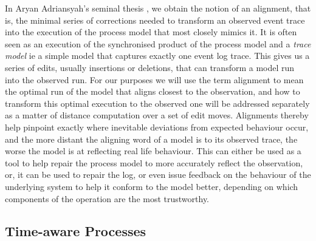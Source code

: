 \documentclass{article}
\theoremstyle{Definition}
\theoremstyle{definition}
\begin{document}
	In Aryan Adriansyah's seminal thesis \cite{Adriansyah2014AligningOA} , we obtain the notion of an alignment, that is, the minimal series of corrections needed to transform an observed event trace into the execution of the process model that most closely mimics it.  
	It is often seen as an execution of the synchronised product of the process model and a \emph{trace model} ie a simple model that captures exactly one event log trace. 
	This gives us a series of edits, usually insertions or deletions, that can transform a model run into the observed run.  
	For our purposes we will use the term alignment to mean the optimal run of the model that aligns closest to the observation, and how to transform this optimal execution to the observed one will be addressed separately as a matter of distance computation over a set of edit moves. 
	Alignments thereby help pinpoint exactly where inevitable deviations from expected behaviour occur, and the more distant the aligning word of a model is to its observed trace, the worse the model is at reflecting real life behaviour. 
	This can either be used as a tool to help repair the process model to more accurately reflect the observation, or, it can be used to repair the log, or even issue feedback on the behaviour of the underlying system to help it conform to the model better, depending on which components of the operation are the most trustworthy. 
	
	\subsection{Time-aware Processes}
	
\end{document}

